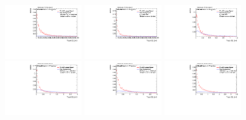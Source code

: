 \begin{figure}
\includegraphics[width=0.3\textwidth]{sascha_input/Appendix/Distributions/w/distributions/beta3/h_normal_tj_C2_3_bin5.pdf} \hspace{1mm}
\includegraphics[width=0.3\textwidth]{sascha_input/Appendix/Distributions/w/distributions/beta3/h_normal_tj_C2_3_bin6.pdf} 
\bigskip
\includegraphics[width=0.3\textwidth]{sascha_input/Appendix/Distributions/w/distributions/beta3/h_normal_tj_D2_3_bin1.pdf} \hspace{1mm}
\includegraphics[width=0.3\textwidth]{sascha_input/Appendix/Distributions/w/distributions/beta3/h_normal_tj_D2_3_bin2.pdf} \hspace{1mm}
\includegraphics[width=0.3\textwidth]{sascha_input/Appendix/Distributions/w/distributions/beta3/h_normal_tj_D2_3_bin3.pdf} 
\bigskip
\includegraphics[width=0.3\textwidth]{sascha_input/Appendix/Distributions/w/distributions/beta3/h_normal_tj_D2_3_bin4.pdf} \hspace{1mm}

\end{figure}
